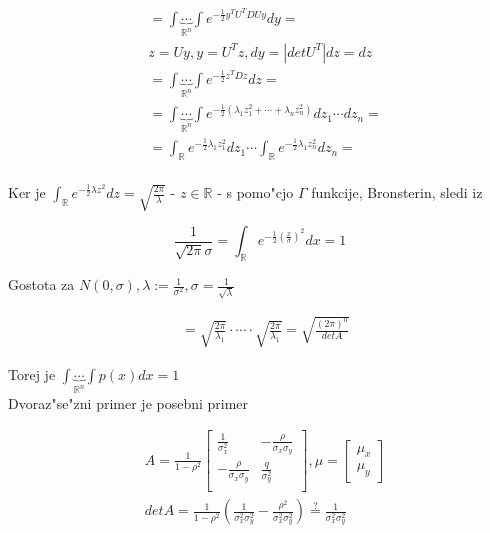 \documentclass[a4paper,12pt]{article}
\theoremstyle{definition}
\theoremstyle{remark}
\newcommand{\R}{\mathbb{R}}
\begin{document}
\begin{align*}
    &= \int \underbrace{\cdots}_{\R^n} \int e^{-\frac{1}{2} y^T U^T D U y} dy = \\
    &z = U y, y = U^T z, dy = |det U^T| dz = dz \\
    &= \int \underbrace{\cdots}_{\R^n} \int e^{-\frac{1}{2} z^T D z} dz = \\
    &= \int \underbrace{\cdots}_{\R^n} \int e^{-\frac{1}{2} (\lambda_1 z_1^2 + \cdots + \lambda_n z_n^2)}
        dz_1 \cdots dz_n = \\
    &= \int_{\R} e^{-\frac{1}{2} \lambda_1 z_1^2} dz_1 \cdots \int_{\R} e^{-\frac{1}{2} \lambda_1 z_n^2} dz_n = \\
\end{align*}

Ker je $\int_{\R} e^{-\frac{1}{2} \lambda z^2} dz = \sqrt{\frac{2\pi}{\lambda}}$ - $z \in \R$ - s pomo"cjo
$\Gamma$ funkcije, Bronsterin, sledi iz

\begin{equation*}
    \frac{1}{\sqrt{2\pi}\sigma} = \int_{\R} e^{-\frac{1}{2} (\frac{x}{\sigma})^2} dx = 1
\end{equation*}

Gostota za $N(0, \sigma), \lambda := \frac{1}{\sigma^2}, \sigma = \frac{1}{\sqrt{\lambda}}$

\begin{align*}
    &= \sqrt{\frac{2\pi}{\lambda_1}} \cdot \cdots \cdot \sqrt{\frac{2\pi}{\lambda_1}} =
        \sqrt{\frac{(2\pi)^n}{det A}}
\end{align*}

Torej je $\int \underbrace{\cdots}_{\R^n} \int p(x) dx = 1$ \\
Dvoraz"se"zni primer je posebni primer

\begin{align*}
    &A = \frac{1}{1-\rho^2} \begin{bmatrix}
            \frac{1}{\sigma_x^2} & -\frac{\rho}{\sigma_x \sigma_y} \\
            -\frac{\rho}{\sigma_x \sigma_y} & \frac{q}{\sigma_y^2} \\
        \end{bmatrix}, \mu = \begin{bmatrix}
            \mu_x \\
            \mu_y
        \end{bmatrix} \\
    &det A = \frac{1}{1-\rho^2} (\frac{1}{\sigma_x^2 \sigma_y^2} - \frac{\rho^2}{\sigma_x^2 \sigma_y^2})
        \stackrel{\text{?}}{=} \frac{1}{\sigma_x^2 \sigma_y^2}
\end{align*}
\end{document}
